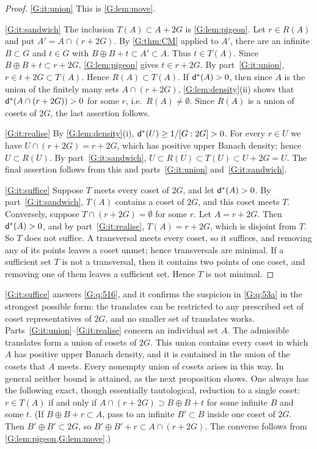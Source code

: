 \begin{proof}
\ref{G:it:union} This is \cref{G:lem:move}.

\ref{G:it:sandwich} The inclusion $T(A)\subset A+2G$ is \cref{G:lem:pigeon}. Let
$r\in R(A)$ and put $A'=A\cap(r+2G)$. By \cref{G:thm:CM} applied to $A'$, there are an
infinite $B\subset G$ and $t\in G$ with $B\oplus B+t\subset A'\subset A$. Thus
$t\in T(A)$. Since $B\oplus B+t\subset r+2G$, \cref{G:lem:pigeon} gives $t\in r+2G$. By
part~\ref{G:it:union}, $r\in t+2G\subset T(A)$. Hence $R(A)\subset T(A)$.
If $\mathsf{d}^*(A)>0$, then since $A$ is the union of the finitely many sets $A\cap(r+2G)$,
\cref{G:lem:density}(ii) shows that $\mathsf{d}^*(A\cap(r+2G))>0$ for some $r$, i.e.\
$R(A)\neq\emptyset$. Since $R(A)$ is a union of cosets of $2G$, the last assertion follows.

\ref{G:it:realise} By \cref{G:lem:density}(i), $\mathsf{d}^*(U)\ge1/[G:2G]>0$. For every
$r\in U$ we have $U\cap(r+2G)=r+2G$, which has positive upper Banach density; hence
$U\subset R(U)$. By part~\ref{G:it:sandwich},
$U\subset R(U)\subset T(U)\subset U+2G=U$. The final assertion follows from this and
parts~\ref{G:it:union} and~\ref{G:it:sandwich}.

\ref{G:it:suffice} Suppose $T$ meets every coset of $2G$, and let $\mathsf{d}^*(A)>0$. By
part~\ref{G:it:sandwich}, $T(A)$ contains a coset of $2G$, and this coset meets $T$.
Conversely, suppose $T\cap(r+2G)=\emptyset$ for some $r$. Let $A=r+2G$. Then
$\mathsf{d}^*(A)>0$, and by part~\ref{G:it:realise}, $T(A)=r+2G$, which is disjoint from $T$.
So $T$ does not suffice.
A transversal meets every coset, so it suffices, and removing any of its points leaves
a coset unmet; hence transversals are minimal. If a sufficient set $T$ is not a
transversal, then it contains two points of one coset, and removing one of them leaves a
sufficient set. Hence $T$ is not minimal.
\end{proof}

\ref{G:it:suffice} answers \cref{G:q:516}, and it confirms the
suspicion in \cref{G:q:53a} in the strongest possible form: the translates can be
restricted to any prescribed set of coset representatives of $2G$, and no smaller set
of translates works. Parts~\ref{G:it:union}--\ref{G:it:realise} concern an individual
set $A$. The admissible translates form a union of cosets of $2G$. This union contains
every coset in which $A$ has positive upper Banach density, and it is contained in the
union of the cosets that $A$ meets. Every nonempty union of cosets arises in this way.
In general neither bound is attained, as the next proposition shows. One always has the
following exact, though essentially tautological, reduction to a single coset:
$r\in T(A)$ if and only if $A\cap(r+2G)\supset B\oplus B+t$ for some infinite $B$ and
some $t$. (If $B\oplus B+r\subset A$, pass to an infinite $B'\subset B$ inside one coset
of $2G$. Then $B'\oplus B'\subset 2G$, so $B'\oplus B'+r\subset A\cap(r+2G)$. The converse
follows from \cref{G:lem:pigeon,G:lem:move}.)

